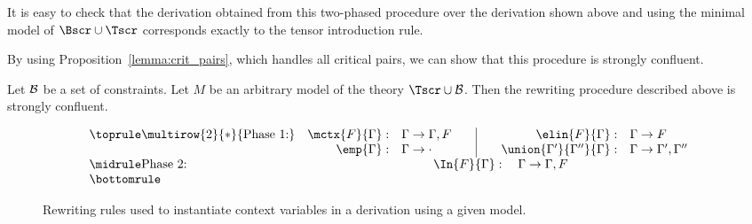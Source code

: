 It is easy to check that the derivation obtained from this two-phased
procedure over the derivation shown above and using the minimal model
of $\Bscr \cup \thSeq$ corresponds exactly to the tensor introduction
rule. 

By using Proposition~\ref{lemma:crit_pairs}, which handles all critical
pairs, we can show that this procedure is strongly confluent.

\begin{proposition}
\label{lemma:convergence}
Let $\mathcal{B}$ be a set of constraints. Let $M$ be an arbitrary model of
the theory $\thSeq \cup
\groundSet$. Then the rewriting procedure described above is
strongly confluent.
\end{proposition}


\begin{figure}[t]
\[
 \begin{array}{l@{\quad}r@{\quad}l@{\qquad}|@{\qquad}r@{\quad}l}
\toprule
\multirow{2}{*}{\textrm{Phase 1:}} & \mctx{F}{\Gamma}: & \Gamma \rightarrow
\Gamma, F 
& \elin{F}{\Gamma}:  & \Gamma \rightarrow F \\
& \emp{\Gamma}: & \Gamma \rightarrow \cdot 
& \union{\Gamma'}{\Gamma''}{\Gamma}: & \Gamma \rightarrow \Gamma',
\Gamma''\\
\midrule
\textrm{Phase 2:} & \multicolumn{4}{c}{
\In{F}{\Gamma}: \quad \Gamma \rightarrow \Gamma, F
}\\
\bottomrule
 \end{array}
\]
\caption{Rewriting rules used to instantiate context variables in a
derivation using a given model.}
\label{fig:rewriting}
\vspace{-5mm}
\end{figure}

\newcommand\bipole{\tsl{bipole}}
\newcommand\bipoleAux{\tsl{bipoleNegative}}



\renewcommand{\algorithmicrequire}{\textbf{Input:}}
\renewcommand{\algorithmicensure}{\textbf{Output:}}

